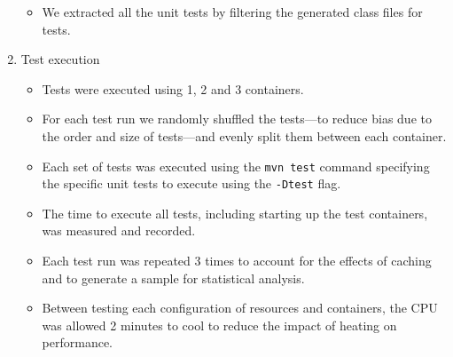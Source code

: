 \begin{enumerate}
\begin{itemize}
        \item We extracted all the unit tests by filtering the generated class files for tests. 
    \end{itemize}
\item Test execution 
\begin{itemize}
        \item Tests were executed using 1, 2 and 3 containers. 
        \item For each test run we randomly shuffled the tests—to reduce bias due to the order and size of tests—and evenly split them between each container. 
        \item Each set of tests was executed using the \texttt{mvn test} command specifying the specific unit tests to execute using the \texttt{-Dtest} flag. 
        \item The time to execute all tests, including starting up the test containers, was measured and recorded. 
        \item Each test run was repeated 3 times to account for the effects of caching and to generate a sample for statistical analysis. 
        \item Between testing each configuration of resources and containers, the CPU was allowed 2 minutes to cool to reduce the impact of heating on performance. 
    \end{itemize}
\end{enumerate}
